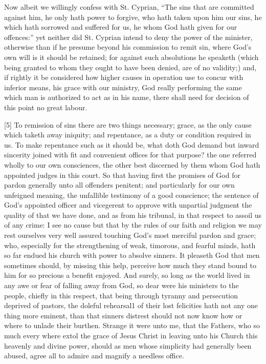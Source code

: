 Now albeit we willingly confess with St. Cyprian, “The sins that are committed against him, he only hath power to forgive, who hath taken upon him our sins, he which hath sorrowed and suffered for us, he whom God hath given for our offences:” yet neither did St. Cyprian intend to deny  the power of the minister, otherwise than if he presume beyond his commission to remit sin, where God’s own will is it should be retained; for against such absolutions he speaketh (which being granted to whom they ought to have been denied, are of no validity;) and, if rightly it be considered how higher causes in operation use to concur with inferior means, his grace with our ministry, God really performing the same which man is authorized to act as in his name, there shall need for decision of this point no great labour.

[5] To remission of sins there are two things necessary; grace, as the only cause which taketh away iniquity; and repentance, as a duty or condition required in us. To make repentance such as it should be, what doth God demand but inward sincerity joined with fit and convenient offices for that purpose? the one referred wholly to our own consciences, the other best discerned by them whom God hath appointed judges in this court. So that having first the promises of God for pardon generally unto all offenders penitent; and particularly for our own unfeigned meaning, the unfallible testimony of a good conscience; the sentence of God’s appointed officer and vicegerent to approve with unpartial judgment the quality of that we have done, and as from his tribunal, in that respect to assoil us of any crime: I see no cause but that by the rules of our faith and religion we may rest ourselves very well assured touching God’s most merciful pardon and grace; who, especially for the strengthening of weak, timorous, and fearful minds, hath so far endued his church with power to absolve sinners. It pleaseth God that men sometimes should, by missing this help, perceive how much they stand bound to him for so precious a benefit enjoyed. And surely, so long as the world lived in any awe or fear of falling away from God, so dear were his ministers to the people, chiefly in this respect, that being through tyranny and persecution deprived of pastors, the doleful rehearsal1 of  their lost felicities hath not any one thing more eminent, than that sinners distrest should not now know how or where to unlade their burthen. Strange it were unto me, that the Fathers, who so much every where extol the grace of Jesus Christ in leaving unto his Church this heavenly and divine power, should as men whose simplicity had generally been abused, agree all to admire and magnify a needless office.

